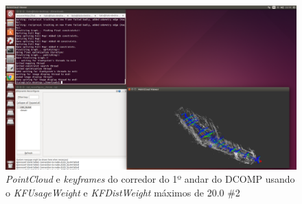 \begin{figure}[!htb]
	\centering
		\includegraphics[width= \textwidth]{Imagens/figura3-41.png}
	\caption{\textit{PointCloud} e \textit{keyframes} do corredor do 1º andar do DCOMP usando o \textit{KFUsageWeight} e \textit{KFDistWeight} máximos de 20.0 \#2}
	\label{fig3:39}
\end{figure}